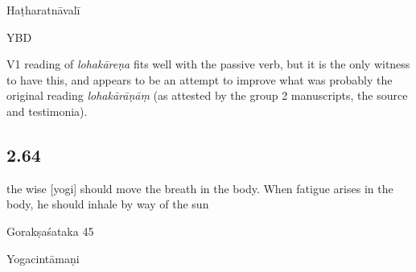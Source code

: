 \begin{ekdosis}
\begin{testimonia}[hp02_063]
Haṭharatnāvalī

\begin{versinnote}
\end{versinnote}

YBD

\begin{versinnote}
\end{versinnote}
\end{testimonia}

\begin{philcomm}[hp02_063]
V1 reading of \emph{lohakāreṇa} fits well with the passive verb, but it is the only witness to have this, and appears to be an attempt to improve what was probably the original reading \emph{lohakārāṇāṃ} (as attested by the group 2 manuscripts, the source and testimonia).
\end{philcomm}

\subsection*{2.64}
\begin{translation}[hp02_064]
[...] the wise [yogi] should move the breath in the body. When fatigue arises in the body, he should inhale by way of the sun
\end{translation}

\begin{sources}[hp02_064]
Gorakṣaśataka 45

\begin{versinnote}
\end{versinnote}
\end{sources}

\begin{testimonia}[hp02_064]
Yogacintāmaṇi

\begin{versinnote}
\end{versinnote}


\end{testimonia}
\end{ekdosis}
